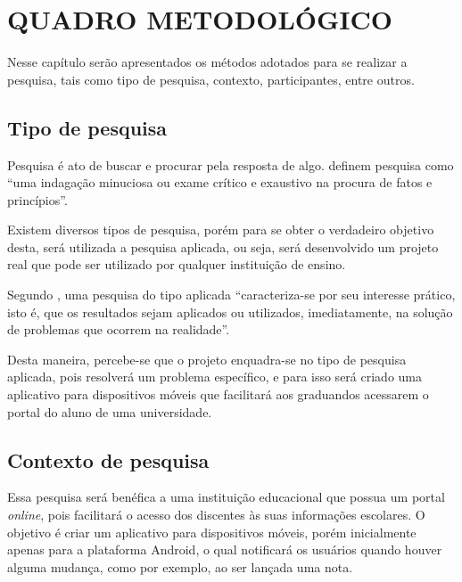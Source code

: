 \chapter{QUADRO METODOLÓGICO}

	\par Nesse capítulo serão apresentados os métodos adotados para se realizar a
pesquisa, tais como tipo de pesquisa, contexto, participantes, entre outros.

\section{Tipo de pesquisa}

	\par Pesquisa é ato de buscar e procurar pela resposta de algo.
 definem pesquisa como “uma indagação minuciosa
ou exame crítico e exaustivo na procura de fatos e princípios”.

	\par Existem diversos tipos de pesquisa, porém para se obter o verdadeiro
objetivo desta, será utilizada a pesquisa aplicada, ou seja, será desenvolvido
um projeto real que pode ser utilizado por qualquer instituição de ensino.

	\par Segundo , uma pesquisa do tipo aplicada
“caracteriza-se por seu interesse prático, isto é, que os resultados sejam
aplicados ou utilizados, imediatamente, na solução de problemas que ocorrem na
realidade”.

	\par Desta maneira, percebe-se que o projeto enquadra-se no tipo de pesquisa
aplicada, pois resolverá um problema específico, e para isso será criado uma
aplicativo para dispositivos móveis que facilitará aos graduandos acessarem o
portal do aluno de uma universidade.

\section{Contexto de pesquisa}

	\par Essa pesquisa será benéfica a uma instituição educacional que possua
um portal \textit{online}, pois facilitará o acesso dos discentes às suas
informações escolares. O objetivo é criar um aplicativo para dispositivos
móveis, porém inicialmente apenas para a plataforma Android, o qual notificará
os usuários quando houver alguma mudança, como por exemplo, ao ser lançada uma
nota.
	
